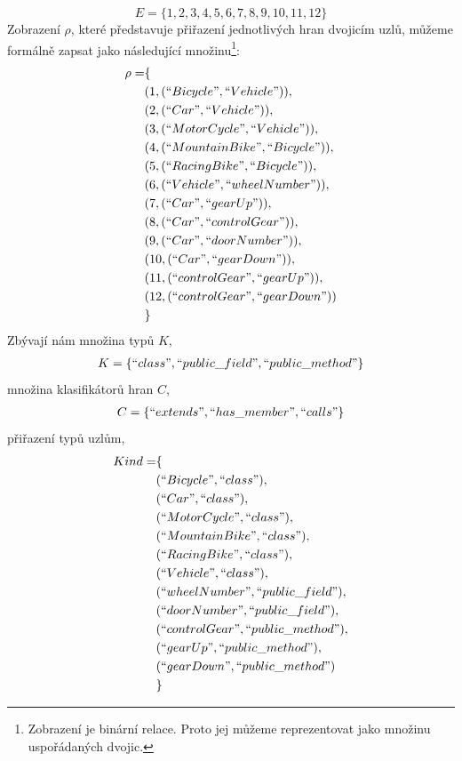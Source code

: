 \begin{displaymath}
  E = \{1, 2, 3, 4, 5, 6, 7, 8, 9, 10, 11, 12\}
\end{displaymath}
Zobrazení $\rho$, které představuje přiřazení jednotlivých hran dvojicím uzlů, můžeme formálně zapsat jako následující množinu\footnote{Zobrazení je binární relace. Proto jej můžeme reprezentovat jako množinu uspořádaných dvojic.}:
\begin{align*}
  \rho = &\{ \\
  &(1, (``Bicycle", ``Vehicle")), \\
  &(2, (``Car", ``Vehicle")), \\
  &(3, (``MotorCycle", ``Vehicle")), \\
  &(4, (``MountainBike", ``Bicycle")), \\
  &(5, (``RacingBike", ``Bicycle")), \\
  &(6, (``Vehicle", ``wheelNumber")), \\
  &(7, (``Car", ``gearUp")), \\
  &(8, (``Car", ``controlGear")), \\
  &(9, (``Car", ``doorNumber")), \\
  &(10, (``Car", ``gearDown")), \\
  &(11, (``controlGear", ``gearUp")), \\
  &(12, (``controlGear", ``gearDown")) \\
  &\}
\end{align*}
Zbývají nám množina typů $K$,
\begin{align*}
  K = \{ ``class", ``public\_field", ``public\_method" \}
\end{align*}
množina klasifikátorů hran $C$,
\begin{align*}
  C = \{ ``extends", ``has\_member", ``calls" \}
\end{align*}
přiřazení typů uzlům,
\begin{align*}
  Kind = &\{ \\
  &(``Bicycle", ``class"), \\
  &(``Car", ``class"), \\
  &(``MotorCycle", ``class"), \\
  &(``MountainBike", ``class"), \\
  &(``RacingBike", ``class"), \\
  &(``Vehicle", ``class"), \\
  &(``wheelNumber", ``public\_field"), \\
  &(``doorNumber", ``public\_field"), \\
  &(``controlGear", ``public\_method"), \\
  &(``gearUp", ``public\_method"), \\
  &(``gearDown", ``public\_method") \\
  &\}
\end{align*}
